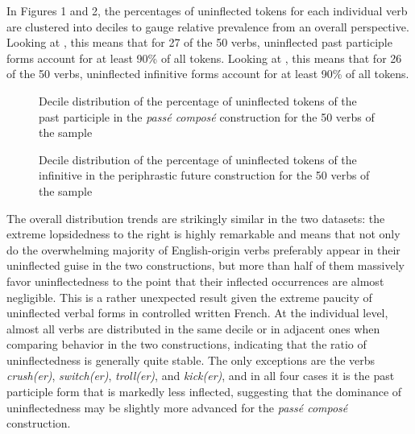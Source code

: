 \documentclass[output=paper]{langscibook}
\begin{document}
In Figures 1 and 2, the percentages of uninflected tokens for each individual verb are clustered into deciles to gauge relative prevalence from an overall perspective. Looking at , this means that for 27 of the 50 verbs, uninflected past participle forms account for at least 90\% of all tokens. Looking at , this means that for 26 of the 50 verbs, uninflected infinitive forms account for at least 90\% of all tokens. 

  
 

\begin{stylelsTableHeading}\begin{figure}
\caption{Decile distribution of the percentage of uninflected tokens of the past participle in the \textit{passé composé} construction for the 50 verbs of the sample}
\label{fig:key:1}
\end{figure}\end{stylelsTableHeading}

  
 

\begin{stylelsTableHeading}\begin{figure}
\caption{Decile distribution of the percentage of uninflected tokens of the infinitive in the periphrastic future construction for the 50 verbs of the sample}
\label{fig:key:2}
\end{figure}\end{stylelsTableHeading}

The overall distribution trends are strikingly similar in the two datasets: the extreme lopsidedness to the right is highly remarkable and means that not only do the overwhelming majority of English-origin verbs preferably appear in their uninflected guise in the two constructions, but more than half of them massively favor uninflectedness to the point that their inflected occurrences are almost negligible. This is a rather unexpected result given the extreme paucity of uninflected verbal forms in controlled written French. At the individual level, almost all verbs are distributed in the same decile or in adjacent ones when comparing behavior in the two constructions, indicating that the ratio of uninflectedness is generally quite stable. The only exceptions are the verbs \textit{crush(er)}, \textit{switch(er)}, \textit{troll(er)}, and \textit{kick(er)}, and in all four cases it is the past participle form that is markedly less inflected, suggesting that the dominance of uninflectedness may be slightly more advanced for the \textit{passé composé} construction.
\end{document}
